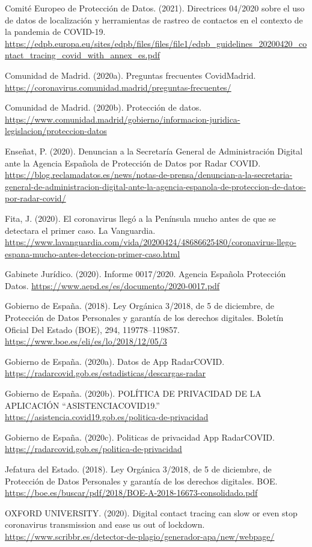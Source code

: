 \documentclass[11pt,a4paper,spanish]{article}
\begin{document}
Comité Europeo de Protección de Datos. (2021). Directrices 04/2020 sobre el uso de datos de localización y herramientas de rastreo de contactos en el contexto de la pandemia de COVID-19. \url{https://edpb.europa.eu/sites/edpb/files/files/file1/edpb_guidelines_20200420_contact_tracing_covid_with_annex_es.pdf} 

Comunidad de Madrid. (2020a). Preguntas frecuentes CovidMadrid. \url{https://coronavirus.comunidad.madrid/preguntas-frecuentes/}

Comunidad de Madrid. (2020b). Protección de datos. \url{https://www.comunidad.madrid/gobierno/informacion-juridica-legislacion/proteccion-datos}

Enseñat, P. (2020). Denuncian a la Secretaría General de Administración Digital ante la Agencia Española de Protección de Datos por Radar COVID. \url{https://blog.reclamadatos.es/news/notas-de-prensa/denuncian-a-la-secretaria-general-de-administracion-digital-ante-la-agencia-espanola-de-proteccion-de-datos-por-radar-covid/}

Fita, J. (2020). El coronavirus llegó a la Península mucho antes de que se detectara el primer caso. La Vanguardia. \url{https://www.lavanguardia.com/vida/20200424/48686625480/coronavirus-llego-espana-mucho-antes-deteccion-primer-caso.html}

Gabinete Jurídico. (2020). Informe 0017/2020. Agencia Española Protección Datos. \url{https://www.aepd.es/es/documento/2020-0017.pdf}

Gobierno de España. (2018). Ley Orgánica 3/2018, de 5 de diciembre, de Protección de Datos Personales y garantía de los derechos digitales. Boletín Oficial Del Estado (BOE), 294, 119778–119857. \url{https://www.boe.es/eli/es/lo/2018/12/05/3}

Gobierno de España. (2020a). Datos de App RadarCOVID. \url{https://radarcovid.gob.es/estadisticas/descargas-radar}

Gobierno de España. (2020b). POLÍTICA DE PRIVACIDAD DE LA APLICACIÓN “ASISTENCIACOVID19.” \url{https://asistencia.covid19.gob.es/politica-de-privacidad}

Gobierno de España. (2020c). Politicas de privacidad App RadarCOVID. \url{https://radarcovid.gob.es/politica-de-privacidad}

Jefatura del Estado. (2018). Ley Orgánica 3/2018, de 5 de diciembre, de Protección de Datos Personales y garantía de los derechos digitales. BOE. \url{https://boe.es/buscar/pdf/2018/BOE-A-2018-16673-consolidado.pdf}

OXFORD UNIVERSITY. (2020). Digital contact tracing can slow or even stop coronavirus transmission and ease us out of lockdown. \url{https://www.scribbr.es/detector-de-plagio/generador-apa/new/webpage/}
\end{document}
